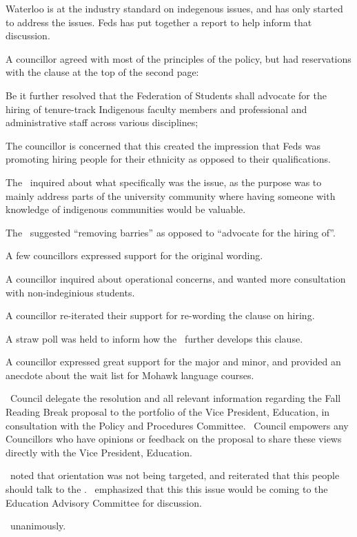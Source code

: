\begin{information}
    Waterloo is at the industry standard on indegenous issues, and has only 
    started to address the issues. Feds has put together a report to help
    inform that discussion. 

    A councillor agreed with most of the principles of the policy, but had 
    reservations with the clause at the top of the second page:

    \begin{information}
        Be it further resolved that the Federation of Students shall advocate for the
        hiring of tenure-track Indigenous faculty members and professional and
        administrative staff across various disciplines;
    \end{information}

    The councillor is concerned that this created the impression that Feds was
    promoting hiring people for their ethnicity as opposed to their
    qualifications. 

    The \vped\ inquired about what specifically was the issue, as the purpose
    was to mainly address parts of the university community where having
    someone with knowledge of indigenous communities would be valuable.

    The \pres\ suggested ``removing barries'' as opposed to ``advocate for 
    the hiring of''.

    A few councillors expressed support for the original wording.

    A councillor inquired about operational concerns, and wanted more
    consultation with non-indeginious students.

    A councillor re-iterated their support for re-wording the clause on hiring. 

    A straw poll was held to inform how the \vpe\ further develops this clause.  

    A councillor expressed great support for the major and minor, and provided 
    an anecdote about the wait list for Mohawk language courses.
\end{information}

\begin{motion}
    \birt\ Council delegate the resolution and all relevant information
    regarding the Fall Reading Break proposal to the portfolio of the Vice
    President, Education, in consultation with the Policy and Procedures
    Committee.
    \bifrt\ Council empowers any Councillors who have opinions or feedback on
    the proposal to share these views directly with the Vice President,
    Education.
    \movers{\seneca}{\andrewc}

    \andrewc\ noted that orientation was not being targeted, and reiterated
    that this people should talk to the \vped. \andrewc\ emphasized that this
    this issue would be coming to the Education Advisory Committee for
    discussion.

    \carries\ unanimously.
\end{motion}

